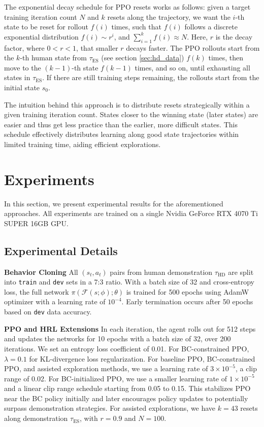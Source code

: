 \documentclass{article}
\begin{document}
The exponential decay schedule for PPO resets works as follows: given a target 
training iteration count $N$ and $k$ resets along the trajectory, we want the 
$i$-th state to be reset for rollout $f(i)$ times, such that $f(i)$ follows a 
discrete exponential distribution $f(i) \sim r^i$, and $\sum_{i=1}^{k} f(i) 
\approx N$. Here, $r$ is the decay factor, where $0 < r < 1$, that smaller $r$ decays 
faster. The PPO rollouts start from the $k$-th human state from 
$\tau_{\text{ES}}$ (see section \ref{sec:hd_data}) $f(k)$ times, then move to 
the $(k-1)$-th state $f(k-1)$ times, and so on, until exhausting all states in 
$\tau_{\text{ES}}$. If there are still training steps remaining, the rollouts 
start from the initial state $s_0$.

The intuition behind this approach is to distribute resets strategically 
within a given training iteration count. States closer to the winning 
state (later states) are easier and thus get less practice than the 
earlier, more difficult states. This schedule effectively distributes 
learning along good state trajectories within limited training time, 
aiding efficient explorations.




\section{Experiments}
In this section, we present experimental results for the aforementioned 
approaches. All experiments are trained on a single Nvidia GeForce RTX 4070 Ti 
SUPER 16GB GPU.

\subsection{Experimental Details}

\textbf{Behavior Cloning} All $(s_t, a_t)$ 
pairs from human demonstration $\tau_{\text{HD}}$ are split into \texttt{train} and \texttt{dev} sets in a 7:3 ratio. 
With a batch size of 32 and cross-entropy loss, the full network 
$\pi(\mathcal{F}(s; \phi);\theta)$ is trained for 500 epochs using 
AdamW optimizer with a learning rate of $10^{-4}$. Early termination 
occurs after 50 epochs based on \texttt{dev} data accuracy.

\textbf{PPO and HRL Extensions} In each iteration, the agent rolls out for 
512 steps and updates the networks for 10 epochs with a batch size of 32, 
over 200 iterations. We set an entropy loss coefficient of 0.01. For 
BC-constrained PPO, $\lambda=0.1$ for KL-divergence loss regularization. For 
baseline PPO, BC-constrained PPO, and assisted exploration methods, we use 
a learning rate of $3\times10^{-5}$, a clip range of 0.02. For BC-initialized 
PPO, we use a smaller learning rate of $1\times10^{-5}$ and a linear clip 
range schedule starting from 0.05 to 0.15. This stabilizes PPO near the BC 
policy initially and later encourages policy updates to potentially surpass 
demonstration strategies. For assisted explorations, we have $k=43$ resets 
along demonstration $\tau_{\text{ES}}$, with $r=0.9$ and $N=100$.
\end{document}
